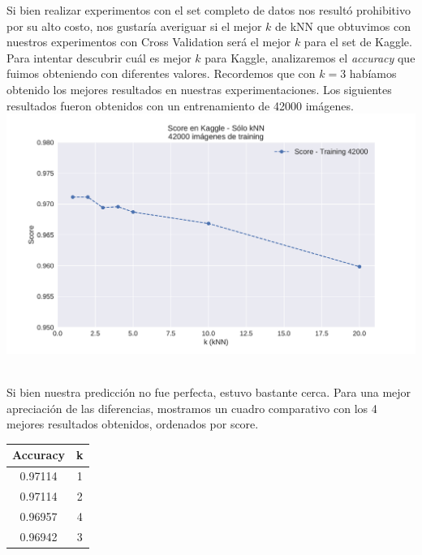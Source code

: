 Si bien realizar experimentos con el set completo de datos nos resultó prohibitivo por su alto costo, nos gustaría averiguar si el mejor $k$ de kNN que obtuvimos con nuestros experimentos con Cross Validation será el mejor $k$ para el set de Kaggle. Para intentar descubrir cuál es mejor $k$ para Kaggle, analizaremos el \textit{accuracy} que fuimos obteniendo con diferentes valores. Recordemos que con $k = 3$ habíamos obtenido los mejores resultados en nuestras experimentaciones. Los siguientes resultados fueron obtenidos con un entrenamiento de 42000 imágenes. \\

{\centering
    \includegraphics[scale=0.60]{informe/imagenes/knn/kaggleknnREENTREGA.pdf} \\
}
$ $\newline

Si bien nuestra predicción no fue perfecta, estuvo bastante cerca. Para una mejor apreciación de las diferencias, mostramos un cuadro comparativo con los 4 mejores resultados obtenidos, ordenados por score. \\

\begin{center}
    \begin{tabular}{| c | c |}
    \hline
     Accuracy    & k  \\ \hline
     0.97114  & 1  \\ \hline
     0.97114  & 2  \\ \hline
     0.96957  & 4  \\ \hline
     0.96942  & 3  \\ \hline
    \end{tabular}
\end{center}


